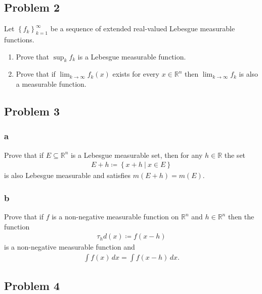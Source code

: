 \hypertarget{problem-2}{%
\subsection{Problem 2}\label{problem-2}}

Let \(\left\{{ f_k }\right\} _{k=1}^{\infty }\) be a sequence of
extended real-valued Lebesgue measurable functions.

\begin{enumerate}
\def\labelenumi{\alph{enumi}.}
\item
  Prove that \(\sup_k f_k\) is a Lebesgue measurable function.
\item
  Prove that if \(\lim_{k \to \infty } f_k(x)\) exists for every
  \(x \in {\mathbb{R}}^n\) then \(\lim_{k\to \infty } f_k\) is also a
  measurable function.
\end{enumerate}

\hypertarget{problem-3}{%
\subsection{Problem 3}\label{problem-3}}

\hypertarget{a}{%
\subsubsection{a}\label{a}}

Prove that if \(E \subseteq {\mathbb{R}}^n\) is a Lebesgue measurable
set, then for any \(h \in {\mathbb{R}}\) the set
\begin{align*}
E+h \coloneqq\left\{{x + h {~\mathrel{\Big|}~}x\in E }\right\}
\end{align*}
is also Lebesgue measurable and satisfies \(m(E + h) = m(E)\).

\hypertarget{b}{%
\subsubsection{b}\label{b}}

Prove that if \(f\) is a non-negative measurable function on
\({\mathbb{R}}^n\) and \(h\in {\mathbb{R}}^n\) then the function
\begin{align*}
\tau_h d(x) \coloneqq f(x-h)
\end{align*}
is a non-negative measurable function and
\begin{align*}
\int f(x) \,dx= \int f(x-h) \,dx
.\end{align*}

\hypertarget{problem-4}{%
\subsection{Problem 4}\label{problem-4}}

